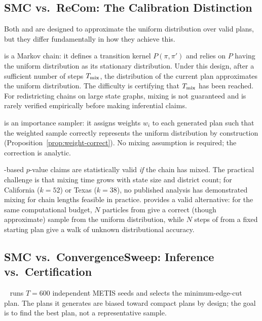 \subsection{SMC vs.\ ReCom: The Calibration Distinction}

Both \smc{} and \recom{} are designed to approximate the uniform distribution
over valid plans, but they differ fundamentally in how they achieve this.

\recom{} is a Markov chain: it defines a transition kernel $P(\pi, \pi')$ and
relies on $P$ having the uniform distribution as its stationary distribution.
Under this design, after a sufficient number of steps $T_{\rm mix}$, the
distribution of the current plan approximates the uniform distribution.
The difficulty is certifying that $T_{\rm mix}$ has been reached.
For redistricting chains on large state graphs, mixing is not guaranteed and
is rarely verified empirically before making inferential claims.

\smc{} is an importance sampler: it assigns weights $w_i$ to each generated
plan such that the weighted sample correctly represents the uniform distribution
by construction (Proposition~\ref{prop:weight-correct}).
No mixing assumption is required; the correction is analytic.

\begin{remark}
\recom{}-based $p$-value claims are statistically valid \emph{if} the chain
has mixed.
The practical challenge is that mixing time grows with state size and district
count; for California ($k = 52$) or Texas ($k = 38$), no published analysis
has demonstrated mixing for chain lengths feasible in practice.
\smc{} provides a valid alternative: for the same computational budget,
$N$ particles from \smc{} give a correct (though approximate) sample from the
uniform distribution, while $N$ steps of \recom{} from a fixed starting plan
give a walk of unknown distributional accuracy.
\end{remark}

\subsection{SMC vs.\ ConvergenceSweep: Inference vs.\ Certification}

\cs{}~\citep{b11paper} runs $T = 600$ independent METIS seeds and selects the
minimum-edge-cut plan.
The plans it generates are biased toward compact plans by design; the goal is
to find the best plan, not a representative sample.

